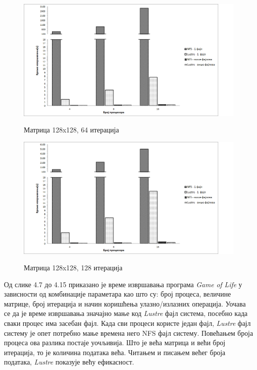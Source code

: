       \begin{figure}[H]
        \centering
            \includegraphics[width=1\textwidth]{slike/results/128_64.png}\\[1cm]
        \caption{Матрица 128x128, 64 итерација}
      \end{figure}
      
      \begin{figure}[H]
        \centering
            \includegraphics[width=1\textwidth]{slike/results/128_128.png}\\[1cm]
       \caption{Матрица 128x128, 128 итерација}
      \end{figure}
  
Од слике 4.7 до 4.15 приказано је време извршавања програма \textit{Game of Life} у зависности од комбинације параметара као што су: број процеса, величине матрице, број итерација и начин коришћења улазно/излазних операција. Уочава се да је време извршавања значајно мање код \textit{Lustre} фајл система, посебно када сваки процес има засебан фајл. Када сви процеси користе један фајл, \textit{Lustre} фајл систему је опет потребно мање времена него NFS фајл систему. Повећањем броја процеса ова разлика постаје уочљивија. 
Што је већа матрица и већи број итерација, то је количина података већа. Читањем и писањем већег броја података, \textit{Lustre} показује већу ефикасност. 
  
 
 
 